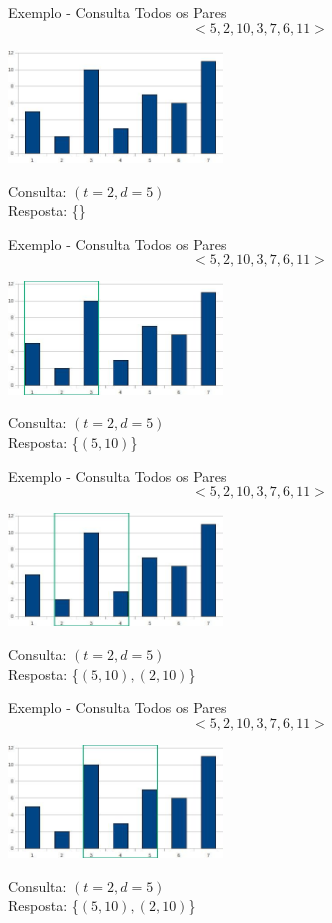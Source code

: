 \documentclass{beamer}
\begin{document}
\begin{frame}{Exemplo - Consulta Todos os Pares}
$$<5, 2, 10, 3, 7, 6, 11>$$
\begin{center}
\includegraphics[height=3.0cm]{g0.jpg}
\end{center}
Consulta: $(t = 2, d = 5)$
\\
Resposta: \{\}
\end{frame}

\begin{frame}{Exemplo - Consulta Todos os Pares}
$$<5, 2, 10, 3, 7, 6, 11>$$
\begin{center}
\includegraphics[height=3.0cm]{g1.jpg}
\end{center}
Consulta: $(t = 2, d = 5)$
\\
Resposta: \{$(5, 10)$\}
\end{frame}

\begin{frame}{Exemplo - Consulta Todos os Pares}
$$<5, 2, 10, 3, 7, 6, 11>$$
\begin{center}
\includegraphics[height=3.0cm]{g2.jpg}
\end{center}
Consulta: $(t = 2, d = 5)$
\\
Resposta: \{$(5, 10), (2, 10)$\}
\end{frame}

\begin{frame}{Exemplo - Consulta Todos os Pares}
$$<5, 2, 10, 3, 7, 6, 11>$$
\begin{center}
\includegraphics[height=3.0cm]{g3.jpg}
\end{center}
Consulta: $(t = 2, d = 5)$
\\
Resposta: \{$(5, 10), (2, 10)$\}
\end{frame}
\end{document}
